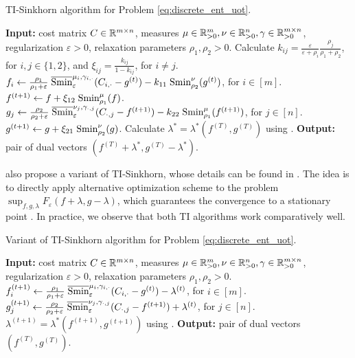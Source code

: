 \begin{algorithm}[t]
  \caption{TI-Sinkhorn algorithm for Problem \eqref{eq:discrete_ent_uot}.}
  \label{alg:TI_Sinkhorn}
\begin{algorithmic}[1]
  \STATE \textbf{Input:} cost matrix $C \in \mathbb R^{m \times n}$,
  measures $\mu \in \mathbb R^m_{> 0}, \nu \in \mathbb R^n_{> 0}, \gamma \in \mathbb R^{m \times n}_{> 0}$,
  regularization $\varepsilon > 0$, relaxation parameters $\rho_1, \rho_2 > 0$.
  \STATE Calculate $k_{ij} = \frac{\varepsilon}{\varepsilon + \rho_i}
  \frac{\rho_j}{\rho_1 + \rho_2}$,
  for $i, j \in \{ 1, 2\}$, and $\xi_{ij} = \frac{k_{ij}}{1 - k_{ij}}$, for $i \neq j$.
  \STATE $f_i \gets \frac{\rho_1}{\rho_1 + \varepsilon} \;
  \overline{\text{Smin}}^{\mu_i, \gamma_{i, \cdot}}_{\varepsilon}(C_{i, \cdot} - g^{(t)})
  - k_{11} \; \text{Smin}^{\nu}_{\rho_2}(g^{(t)})$, for $i \in [m]$.
  \STATE $f^{(t+1)} \gets f + \xi_{12} \; \text{Smin}^{\mu}_{\rho_1}(f)$.
  \STATE $g_j \gets \frac{\rho_2}{\rho_2 + \varepsilon} \;
  \overline{\text{Smin}}^{\nu_j, \gamma_{\cdot, j}}_{\varepsilon}(C_{\cdot, j} - f^{(t+1)})
  - k_{22} \; \text{Smin}^{\mu}_{\rho_1}(f^{(t+1)})$, for $j \in [n]$.
  \STATE $g^{(t+1)} \gets g + \xi_{21} \; \text{Smin}^{\nu}_{\rho_2}(g)$.
  \ENDFOR
  \STATE Calculate $\lambda^* = \lambda^*(f^{(T)}, g^{(T)})$ using .
  \STATE \textbf{Output:} pair of dual vectors $(f^{(T)} + \lambda^*, g^{(T)} - \lambda^*)$.
\end{algorithmic}
\end{algorithm}

\citep{Sejourne21} also propose a variant of TI-Sinkhorn, whose details can be found in
. The idea is to directly apply alternative optimization scheme
to the problem $\sup_{f, g, \lambda} F_{\varepsilon}(f + \lambda, g - \lambda)$, which guarantees
the convergence to a stationary point \citep{Tseng01}. In practice,
we observe that both TI algorithms work comparatively well.
\begin{algorithm}[t]
  \caption{Variant of TI-Sinkhorn algorithm for Problem \eqref{eq:discrete_ent_uot}.}
  \label{alg:TI_Sinkhorn_variant}
\begin{algorithmic}[1]
  \STATE \textbf{Input:} cost matrix $C \in \mathbb R^{m \times n}$,
  measures $\mu \in \mathbb R^m_{> 0}, \nu \in \mathbb R^n_{> 0}, \gamma \in \mathbb R^{m \times n}_{> 0}$,
  regularization $\varepsilon > 0$, relaxation parameters $\rho_1, \rho_2 > 0$.
  \STATE $f_i^{(t+1)} \gets \frac{\rho_1}{\rho_1 + \varepsilon} \;
  \overline{\text{Smin}}^{\mu_i, \gamma_{i, \cdot}}_{\varepsilon}(C_{i, \cdot} - g^{(t)})
  - \lambda^{(t)}$, for $i \in [m]$.
  \STATE $g_j^{(t+1)} \gets \frac{\rho_2}{\rho_2 + \varepsilon} \;
  \overline{\text{Smin}}^{\nu_j, \gamma_{\cdot, j}}_{\varepsilon}(C_{\cdot, j} - f^{(t+1)})
  + \lambda^{(t)}$, for $j \in [n]$.
  \STATE $\lambda^{(t+1)} = \lambda^*(f^{(t+1)}, g^{(t+1)})$ using .
  \ENDFOR
  \STATE \textbf{Output:} pair of dual vectors $(f^{(T)}, g^{(T)})$.
\end{algorithmic}
\end{algorithm}

